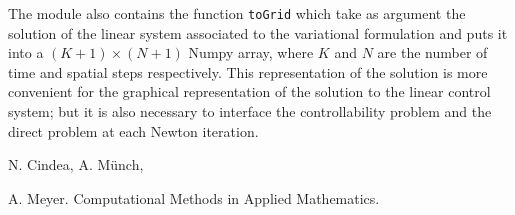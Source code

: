 \documentclass{amsart}
\theoremstyle{plain}
\theoremstyle{definition}
\theoremstyle{remark}
\numberwithin{equation}{section}
\begin{document}
The module also contains the function \verb|toGrid| which take as argument the solution of the
linear  system associated to the variational formulation and puts it into a $(K+1)\times (N+1)$ Numpy
array, where $K$ and $N$ are the number of time and spatial steps respectively.
This representation of the solution is more convenient for the graphical representation of
the solution to the linear control system; but it is also necessary to interface the
controllability problem and the direct problem at each Newton iteration.


\begin{thebibliography}{99}

 N. Cindea, A. M\"unch, 

 A. Meyer.  {Computational Methods in Applied Mathematics.}


\end{thebibliography}
\end{document}
